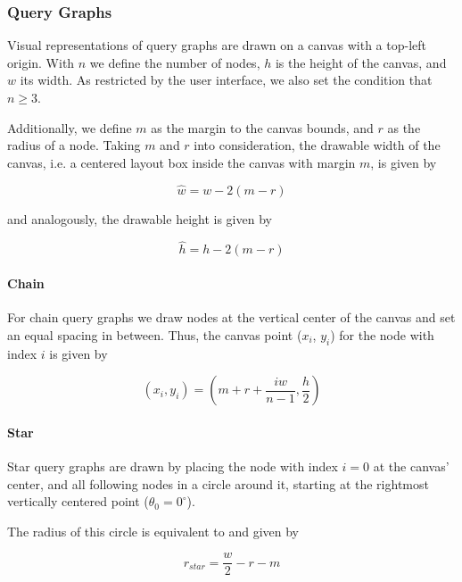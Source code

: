 \subsubsection{Query Graphs}

Visual representations of query graphs are drawn on a canvas with a top-left origin.
With $n$ we define the number of nodes, $h$ is the height of the canvas, and $w$ its width. 
As restricted by the user interface, we also set the condition that $n \geq 3$.

Additionally, we define $m$ as the margin to the canvas bounds, and $r$ as the radius of a node.
Taking $m$ and $r$ into consideration, the drawable width of the canvas, i.e. a centered layout box inside the canvas with margin $m$, is given by 

\begin{equation}\label{eqn:painting-w_hat}
    \hat{w} = w - 2(m - r)
\end{equation}

and analogously, the drawable height is given by

\begin{equation}\label{eqn:painting-h_hat}
    \hat{h} = h - 2(m - r)    
\end{equation}

\paragraph{Chain} For chain query graphs we draw nodes at the vertical center of the canvas and set an equal spacing in between. Thus, the canvas point ($x_i$, $y_i$) for the node with index $i$ is given by


\begin{equation}
    (x_i, y_i) = (m + r + \frac{i\hat{w}}{n - 1}, \frac{h}{2})
\end{equation}

\paragraph{Star} 
Star query graphs are drawn by placing the node with index $i = 0$ at the canvas' center, and all following nodes in a circle around it, starting at the rightmost vertically centered point ($\theta_0 = 0^{\circ}$).

The radius of this circle is equivalent to %
and given by 

\begin{equation}\label{eqn:painting-r_star}
    r_{star} = \frac{w}{2} - r - m
\end{equation}

